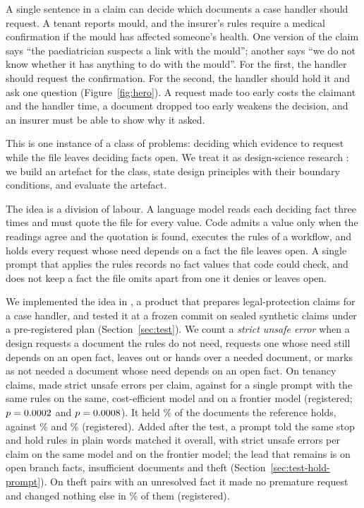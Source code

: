 A single sentence in a claim can decide which documents a case handler should request. A tenant reports mould, and the insurer's rules require a medical confirmation if the mould has affected someone's health. One version of the claim says ``the paediatrician suspects a link with the mould''; another says ``we do not know whether it has anything to do with the mould''. For the first, the handler should request the confirmation. For the second, the handler should hold it and ask one question (Figure~\ref{fig:hero}). A request made too early costs the claimant and the handler time, a document dropped too early weakens the decision, and an insurer must be able to show why it asked.

This is one instance of a class of problems: deciding which evidence to request while the file leaves deciding facts open. We treat it as design-science research \cite{hevner2004design,gregor2013positioning}: we build an artefact for the class, state design principles with their boundary conditions, and evaluate the artefact.

The idea is a division of labour. A language model reads each deciding fact three times and must quote the file for every value. Code admits a value only when the readings agree and the quotation is found, executes the rules of a workflow, and holds every request whose need depends on a fact the file leaves open. A single prompt that applies the rules records no fact values that code could check, and does not keep a fact the file omits apart from one it denies or leaves open.

We implemented the idea in \casepath, a product that prepares legal-protection claims for a case handler, and tested it at a frozen commit on sealed synthetic claims under a pre-registered plan (Section~\ref{sec:test}). We count a \emph{strict unsafe error} when a design requests a document the rules do not need, requests one whose need still depends on an open fact, leaves out or hands over a needed document, or marks as not needed a document whose need depends on an open fact. On tenancy claims, \casepath made \sthreeHTwoA{} strict unsafe errors per claim, against \sthreeHTwoB{} for a single prompt with the same rules on the same, cost-efficient model and \sthreeHThreeB{} on a frontier model (registered; $p= 0.0002$ and $p= 0.0008$). It held \sthreeCasePathTenCorrectHold\% of the documents the reference holds, against \sthreeRicTenCorrectHold\% and \sthreeRicFrontierTenCorrectHold\% (registered). Added after the test, a prompt told the same stop and hold rules in plain words matched it overall, with \sbcHoldPromptAllStrict{} strict unsafe errors per claim on the same model and \sbcHoldPromptFrontierAllStrict{} on the frontier model; the lead that remains is on open branch facts, insufficient documents and theft (Section~\ref{sec:test-hold-prompt}). On theft pairs with an unresolved fact it made no premature request and changed nothing else in \sthreeCasePathThOpenUnchanged\% of them (registered).

